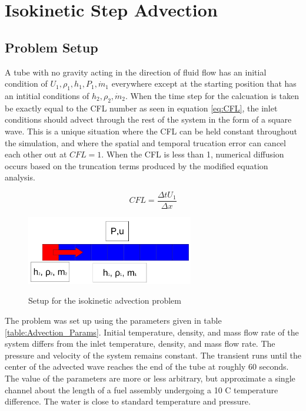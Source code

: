 \vspace*{-80mm}
\chapter{Isokinetic Step Advection} \label{chapter4:Isokinetic_Step_Advection}
 
	\section{Problem Setup} \label{Verification:Advection}
    
    A tube with no gravity acting in the direction of fluid flow has an initial
    condition of $U_{1},\rho_{1},h_{1},P_{1},\dot{m}_{1}$ everywhere except at the 
    starting position that has an intitial conditions of $h_{2},\rho_{2},\dot{m}_{2}$. 
    When the time step for the calcuation is taken be exactly equal to the CFL
    number as seen in equation \ref{eq:CFL}, the inlet conditions should advect
    through the rest of the system in the form of a square wave. This is a
    unique situation where the CFL can be held constant throughout the
    simulation, and where the spatial and temporal trucation error can cancel
    each other out at $CFL=1$. When the CFL is less than 1, numerical
    diffusion occurs based on the truncation terms produced by the modified
    equation analysis.
    
    \begin{equation}
    	\label{eq:CFL}
    	CFL = \frac{\Delta t  U_{1} }{\Delta x}
    \end{equation}
    
    \begin{figure}[!h]
    	\centering
    	\includegraphics[width=0.65\textwidth]{images/Verification_Problem1_advection}
    	\label{fig:Verification_1}
    	\caption{Setup for the isokinetic advection problem}
    \end{figure}
    
    The problem was set up using the parameters given in table
    \ref{table:Advection_Params}. Initial temperature, density, and mass flow
    rate of the system differs from the inlet temperature, density, and mass
    flow rate. The pressure and velocity of the system remains constant. The
    transient runs until the center of the advected wave reaches the end of the
    tube at roughly 60 seconds. The value of the parameters are more or less
    arbitrary, but approximate a single channel about the length of a fuel
    assembly undergoing a 10 C temperature difference. The water is close to
    standard temperature and pressure. 
    
